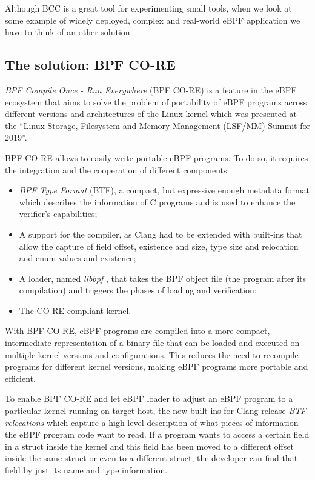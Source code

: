 Although BCC is a great tool for experimenting small tools, when we look at some example of widely deployed, complex and real-world eBPF application we have to think of an other solution.

\subsection{The solution: BPF CO-RE}

\textit{BPF Compile Once - Run Everywhere} (BPF CO-RE) is a feature in the eBPF ecosystem that aims to solve the problem of portability of eBPF programs across different versions and architectures of the Linux kernel which was presented at the ``Linux Storage, Filesystem and Memory Management (LSF/MM) Summit for 2019''.

BPF CO-RE allows to easily write portable eBPF programs.
To do so, it requires the integration and the cooperation of different components:

\begin{itemize}
	\item \textit{BPF Type Format} (BTF), a compact, but expressive enough metadata
		format which describes the information of C programs and is used to enhance the verifier's capabilities;
	\item A support for the compiler, as Clang  had to be extended with built-ins that
		allow the capture of field offset, existence and size, type size and relocation and enum values and existence;
	\item A loader, named \textit{libbpf} \cite{libbpfGitHub}, that takes the BPF
		object file (the program after its compilation) and triggers the phases of loading and verification;
	\item The CO-RE compliant kernel.
\end{itemize}

With BPF CO-RE, eBPF programs are compiled into a more compact, intermediate representation of a binary file that can be loaded and executed on multiple kernel versions and configurations.
This reduces the need to recompile programs for different kernel versions, making eBPF programs more portable and efficient. 

To enable BPF CO-RE and let eBPF loader to adjust an eBPF program to a particular kernel running on target host, the new built-ins for Clang release \textit{BTF relocations} which capture a high-level description of what pieces of information the eBPF program code want to read.
If a program wants to access a certain field in a struct inside the kernel and this field has been moved to a different offset inside the same struct or even to a different struct, the developer can find that field by just its name and type information.

